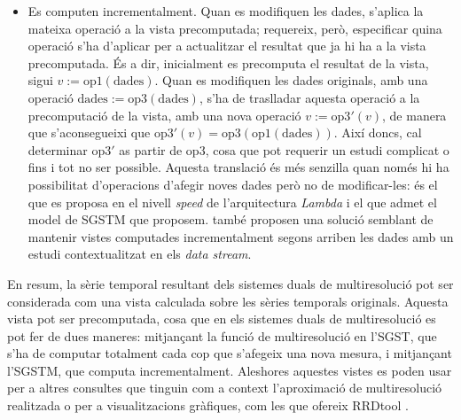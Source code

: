 \begin{itemize}
\item Es computen incrementalment. Quan es modifiquen les dades,
  s'aplica la mateixa operació a la vista precomputada; requereix,
  però, especificar quina operació s'ha d'aplicar per a actualitzar el
  resultat que ja hi ha a la vista precomputada. És a dir, inicialment
  es precomputa el resultat de la vista, sigui
  $v:=\text{op1}(\text{dades})$. Quan es modifiquen les dades
  originals, amb una operació $\text{dades} :=
  \text{op3}(\text{dades})$, s'ha de traslladar aquesta operació a la
  precomputació de la vista, amb una nova operació $v:=
  \text{op3}'(v)$, de manera que s'aconsegueixi que
  $\text{op3}'(v)=\text{op3}(\text{op1}(\text{dades}))$. Així doncs,
  cal determinar $\text{op3}'$ as partir de $\text{op3}$, cosa que pot
  requerir un estudi complicat o fins i tot no ser possible.  Aquesta
  translació és més senzilla quan només hi ha possibilitat
  d'operacions d'afegir noves dades però no de modificar-les: és el
  que es proposa en el nivell \emph{speed} de l'arquitectura
  \emph{Lambda} i el que admet el model de \gls{SGSTM} que
  proposem. \textcite{jagadish95} també proposen una solució semblant
  de mantenir vistes computades incrementalment segons arriben les
  dades amb un estudi contextualitzat en els \emph{data stream}.
\end{itemize}



En resum, la sèrie temporal resultant dels sistemes duals de
multiresolució pot ser considerada com una vista calculada sobre les
sèries temporals originals. Aquesta vista pot ser precomputada, cosa
que en els sistemes duals de multiresolució es pot fer de dues
maneres: mitjançant la funció de multiresolució en l'\gls{SGST}, que
s'ha de computar totalment cada cop que s'afegeix una nova mesura, i
mitjançant l'\gls{SGSTM}, que computa incrementalment.  Aleshores
aquestes vistes es poden usar per a altres consultes que tinguin com a
context l'aproximació de multiresolució realitzada o per a
visualitzacions gràfiques, com les que ofereix RRDtool \cite{rrdtool}.






